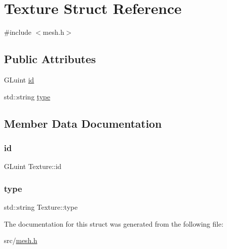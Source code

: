\hypertarget{structTexture}{}\section{Texture Struct Reference}
\label{structTexture}


{\ttfamily \#include $<$mesh.\+h$>$}

\subsection*{Public Attributes}
\begin{DoxyCompactItemize}
\item 
G\+Luint \hyperlink{structTexture_af848138d72c1fc995ab414a71ab10d47}{id}
\item 
std\+::string \hyperlink{structTexture_a916a835d009806f2a57546c7705942b1}{type}
\end{DoxyCompactItemize}


\subsection{Member Data Documentation}
\mbox{\label{structTexture_af848138d72c1fc995ab414a71ab10d47}} 
\subsubsection{\texorpdfstring{id}{id}}
{\footnotesize\ttfamily G\+Luint Texture\+::id}

\mbox{\label{structTexture_a916a835d009806f2a57546c7705942b1}} 
\subsubsection{\texorpdfstring{type}{type}}
{\footnotesize\ttfamily std\+::string Texture\+::type}



The documentation for this struct was generated from the following file\+:\begin{DoxyCompactItemize}
\item 
src/\hyperlink{mesh_8h}{mesh.\+h}\end{DoxyCompactItemize}

